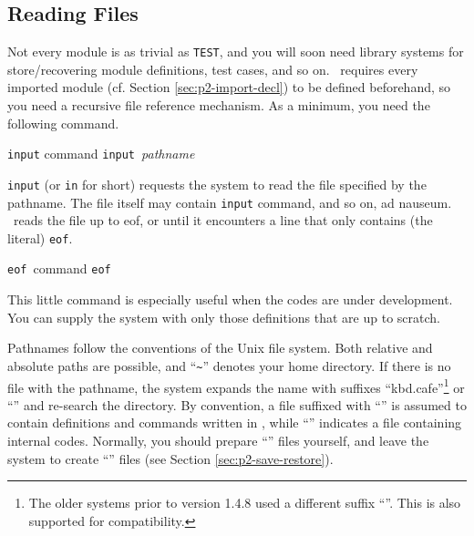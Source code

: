 \documentclass[a4paper]{memoir}
\begin{document}
\subsection{Reading Files}\label{sec:p2-reading-files}

Not every module is as trivial as \verb|TEST|, and you will %
soon need library systems for store/recovering module definitions,
test cases, and so on. \cafeobj~requires every imported module
(cf. Section 
\ref{sec:p2-import-decl}) to be
defined beforehand, so you need a recursive file reference
mechanism. As a minimum, you need the following command.

\begin{bsyntax} \texttt{input} command\Hline
\texttt{input}~\textit{pathname}
\end{bsyntax}

\verb|input| (or \verb|in| for short)
requests the system to read the file specified by the
pathname. The file itself may contain \verb|input| command, and so on,
ad nauseum. \cafeobj~reads the file up to eof, or until it encounters
a line that only contains (the literal) \verb|eof|.

\begin{bsyntax} \texttt{eof}~command \Hline
\texttt{eof}
\end{bsyntax}

This little command is especially useful when the %
codes are under development. You can supply the system with only those
definitions that are up to scratch.

Pathnames follow the conventions of the Unix file system. Both
relative and absolute paths are possible, and
``\verb|~|'' 
denotes your home directory.
If there is no file with the pathname, the system expands the name
with suffixes ``kbd{.cafe}''\footnote{The older systems prior
  to version 1.4.8 used a different suffix ``''. 
  This is also supported for compatibility.}
 
or ``''
 and re-search the
directory. By convention, a file suffixed with ``'' is assumed
to contain definitions and commands written in \cafeobj, 
while ``''
indicates a file containing internal codes. Normally, you should prepare
``'' files yourself, and leave the system to create
``'' files (see Section \ref{sec:p2-save-restore}).
\end{document}
